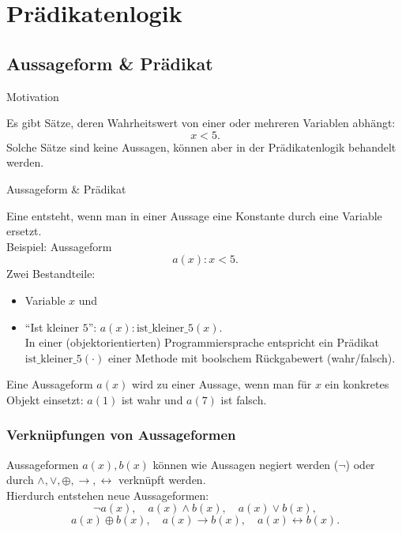 \section{Prädikatenlogik}
\subsection{Aussageform \& Prädikat}
%
\begin{frame}{Motivation}
	
	Es gibt Sätze, deren Wahrheitswert von einer oder mehreren Variablen abhängt:
	$$
		x < 5.
	$$
	Solche Sätze sind keine Aussagen, können aber in der Prädikatenlogik behandelt werden.
	
\end{frame}
%
%
\begin{frame}{Aussageform \& Prädikat}
	
	Eine  entsteht, wenn man in einer Aussage eine Konstante durch eine Variable ersetzt.\\[3mm]
	
	\pause
	Beispiel: Aussageform
	$$
		a(x): x < 5.
	$$
	Zwei Bestandteile:
	\begin{itemize}
		\item Variable $x$ und
		\item {} ``Ist kleiner $5$'': $a(x): \text{ist\_kleiner\_5}(x)$.\\[1mm]
		
			In einer (objektorientierten) Programmiersprache entspricht ein Prädikat $\text{ist\_kleiner\_5}(\cdot)$
			einer Methode mit boolschem Rückgabewert (wahr/falsch). 
	\end{itemize}
	
	\vfill
	\pause
	Eine Aussageform $a(x)$ wird zu einer Aussage, wenn man für $x$ ein konkretes Objekt einsetzt:
	$a(1)$ ist wahr und $a(7)$ ist falsch.
	
\end{frame}
%
\begin{frame}\frametitle{Verknüpfungen von Aussageformen}
	
	Aussageformen $a(x), b(x)$ können wie Aussagen negiert werden ($\neg$) oder durch 
	$\land, \lor, \oplus, \rightarrow, \leftrightarrow$ verknüpft werden.\\
	Hierdurch entstehen neue Aussageformen:
	$$
		\neg a(x), \quad a(x) \land b(x), \quad a(x) \lor b(x), 
	$$
	$$
		a(x) \oplus b(x), \quad a(x) \rightarrow b(x),\quad a(x) \leftrightarrow b(x).
	$$
\end{frame}
%
